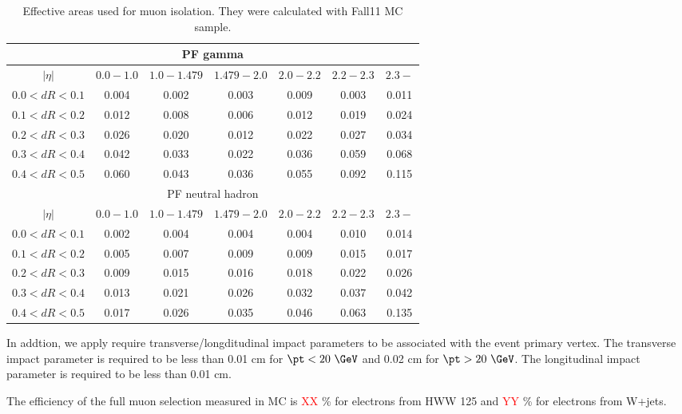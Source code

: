 \begin{table}[htp]
	\centering
		\begin{tabular}{c|c|c|c|c|c|c}
			\hline 
				\multicolumn{7}{c}{PF gamma} \\
	  	    \hline
			 	$|\eta|$     & $0.0 - 1.0$ & $1.0 - 1.479$ & $1.479 - 2.0$ & $2.0 - 2.2$ & $2.2 - 2.3$ & $2.3-$ \\       		
	  	    \hline \hline
				$0.0<dR<0.1$ & 0.004& 0.002& 0.003& 0.009& 0.003& 0.011 \\
				$0.1<dR<0.2$ & 0.012& 0.008& 0.006& 0.012& 0.019& 0.024 \\
				$0.2<dR<0.3$ & 0.026& 0.020& 0.012& 0.022& 0.027& 0.034 \\
				$0.3<dR<0.4$ & 0.042& 0.033& 0.022& 0.036& 0.059& 0.068 \\
				$0.4<dR<0.5$ & 0.060& 0.043& 0.036& 0.055& 0.092& 0.115 \\
	  	    \hline \hline 
				\multicolumn{7}{c}{PF neutral hadron} \\
	  	    \hline 
			 	$|\eta|$     & $0.0 - 1.0$ & $1.0 - 1.479$ & $1.479 - 2.0$ & $2.0 - 2.2$ & $2.2 - 2.3$ & $2.3-$ \\       		
	  	    \hline \hline
				$0.0<dR<0.1$ & 0.002& 0.004& 0.004& 0.004& 0.010& 0.014 \\
			    $0.1<dR<0.2$ & 0.005& 0.007& 0.009& 0.009& 0.015& 0.017 \\
			    $0.2<dR<0.3$ & 0.009& 0.015& 0.016& 0.018& 0.022& 0.026 \\ 
				$0.3<dR<0.4$ & 0.013& 0.021& 0.026& 0.032& 0.037& 0.042 \\ 
				$0.4<dR<0.5$ & 0.017& 0.026& 0.035& 0.046& 0.063& 0.135 \\ 
			\hline
		\end{tabular}
		\caption{ Effective areas used for muon isolation. They were calculated with Fall11 MC sample.}
	\label{tab:muAeff}
\end{table}

In addtion, we apply require transverse/longditudinal impact parameters 
to be associated with the event primary vertex. 
The transverse impact parameter is required 
to be less than 0.01 cm for $\pt<20~\GeV$ and 0.02 cm for $\pt>20~\GeV$. 
The longitudinal impact parameter is required to be less than 0.01 cm. 

The efficiency of the full muon selection measured in MC is \textcolor{red}{XX} \% 
for electrons from HWW 125 and \textcolor{red}{YY} \% for electrons from W+jets.  


